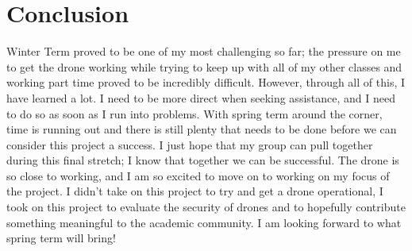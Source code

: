 \documentclass[IEEEtran,letterpaper,10pt,notitlepage,draftclsnofoot,onecolumn]{article}
\begin{document}
\section{Conclusion}
Winter Term proved to be one of my most challenging so far; the pressure on me to get the drone working while trying to keep up with all of my other classes and working part time proved to be incredibly difficult. However, through all of this, I have learned a lot. I need to be more direct when seeking assistance, and I need to do so as soon as I run into problems. With spring term around the corner, time is running out and there is still plenty that needs to be done before we can consider this project a success. I just hope that my group can pull together during this final stretch; I know that together we can be successful. The drone is so close to working, and I am so excited to move on to working on my focus of the project. I didn't take on this project to try and get a drone operational, I took on this project to evaluate the security of drones and to hopefully contribute something meaningful to the academic community. I am looking forward to what spring term will bring!
\end{document}
